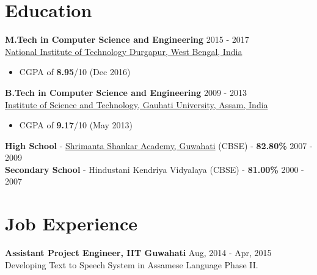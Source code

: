 \documentclass[margin, centered]{res}
\begin{document}
\begin{resume}

\section{Education}
\textbf{M.Tech in Computer Science and Engineering} \hfill 2015 - 2017 \\
\href{http://www.nitdgp.ac.in/}{National Institute of Technology Durgapur, West Bengal, India}
\begin{itemize}
 \item CGPA of \textbf{8.95}/10 (Dec 2016)
\end{itemize}
\textbf{B.Tech in Computer Science and Engineering} \hfill 2009 - 2013 \\
\href{http://www.gauhati.ac.in/}{Institute of Science and Technology, Gauhati University, Assam, India}
\begin{itemize}
 \item CGPA of \textbf{9.17}/10 (May 2013)
\end{itemize}
\textbf{High School} - \href{http://www.ssa-school.org/}{Shrimanta Shankar Academy, Guwahati} (CBSE) - \textbf{82.80\%} \hfill 2007 - 2009 \\
\textbf{Secondary School} - Hindustani Kendriya Vidyalaya (CBSE) - \textbf{81.00\%} \hfill 2000 - 2007
 
\section{Job Experience}
\textbf{Assistant Project Engineer, IIT Guwahati} \hfill Aug, 2014 - Apr, 2015\\
Developing Text to Speech System in Assamese Language Phase II. \\


\end{resume}
\end{document}

